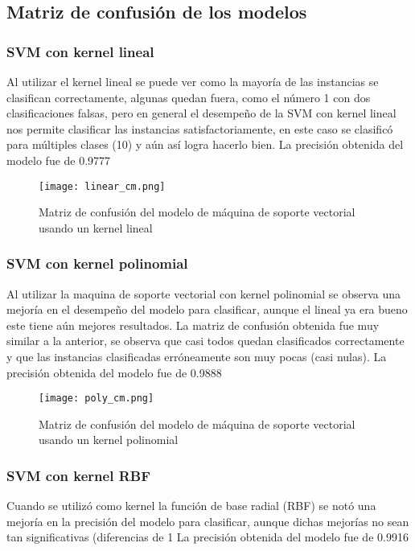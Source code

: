 \documentclass[sigconf,authorversion,nonacm]{acmart}
\begin{document}
\subsection{Matriz de confusión de los modelos}
\subsubsection{SVM con kernel lineal}
Al utilizar el kernel lineal se puede ver como la mayoría de las instancias se clasifican correctamente, algunas quedan fuera, como el número 1 con dos clasificaciones falsas, pero en general el desempeño de la SVM con kernel lineal nos permite clasificar las instancias satisfactoriamente, en este caso se clasificó para múltiples clases (10) y aún así logra hacerlo bien.
La precisión obtenida del modelo fue de 0.9777

\begin{figure}[H]
  \centering
  \texttt{[image: linear\_cm.png]}
  \caption{Matriz de confusión del modelo de máquina de soporte vectorial usando un kernel lineal}
\end{figure}

\subsubsection{SVM con kernel polinomial}
Al utilizar la maquina de soporte vectorial con kernel polinomial se observa una mejoría en el desempeño del modelo para clasificar, aunque el lineal ya era bueno este tiene aún mejores resultados. La matriz de confusión obtenida fue muy similar a la anterior, se observa que casi todos quedan clasificados correctamente y que las instancias clasificadas erróneamente son muy pocas (casi nulas).
La precisión obtenida del modelo fue de 0.9888

\begin{figure}[H]
  \centering
  \texttt{[image: poly\_cm.png]}
  \caption{Matriz de confusión del modelo de máquina de soporte vectorial usando un kernel polinomial}
\end{figure}

\subsubsection{SVM con kernel RBF}
Cuando se utilizó como kernel la función de base radial (RBF) se notó una mejoría en la precisión del modelo para clasificar, aunque dichas mejorías no sean tan significativas (diferencias de 1%
La precisión obtenida del modelo fue de 0.9916
\end{document}
